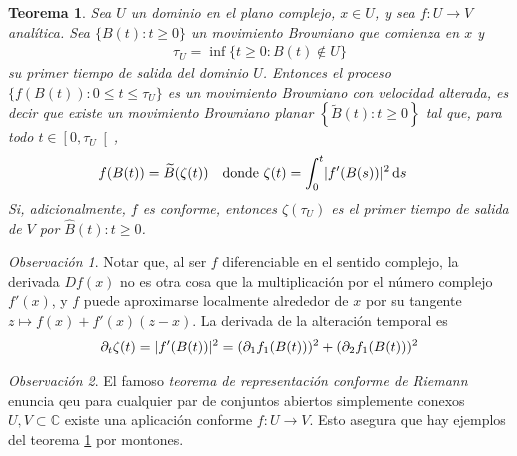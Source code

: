 \documentclass{article}
\newcommand{\dd}{\mathop{}\!\mathrm{d}}
\newcommand{\complexNumbers}{\mathbb{C}}
\DeclarePairedDelimiter{\abs}{\lvert}{\rvert}
\theoremstyle{plain}
\newtheorem{theorem}{Teorema}
\theoremstyle{remark}
\newtheorem{remark}{Observación}
\theoremstyle{definition}
\begin{document}
\begin{theorem}
  \label{theorem:ConformalInvarianceOfPlanarBrownianMotion}
  Sea \(U\) un dominio en el plano complejo, \(x \in U\), y sea \(f : U \rightarrow V\) analítica.
  Sea \(\{B(t) : t \geq 0\}\) un movimiento Browniano que comienza en \(x\) y
  \begin{align}
    \tau_U
    =
    \inf \{ t \geq 0 : B(t) \notin U\}
  \end{align}
  su primer tiempo de salida del dominio \(U\).
  Entonces el proceso
  \(\{f(B(t)) : 0 \leq t \leq \tau_U\}\)  %
  es un movimiento Browniano con velocidad alterada, es decir que existe un movimiento Browniano planar \(\left\{ \widetilde{B}(t) : t \geq 0 \right\}\) tal que, para todo \(t \in \left[ 0, \tau_U \right[\),
  \begin{align}
    & f(B(t)) = \widetilde{B}(\zeta(t))
    &
    & \text{donde }
    \zeta(t) = \int_0^t \abs{f'(B(s))}^2 \dd s
  \end{align}
  Si, adicionalmente, \(f\) es conforme, entonces \(\zeta(\tau_U)\) es el primer tiempo de salida de \(V\) por \(\widehat{B}(t) : t \geq 0\).
\end{theorem}
\begin{remark}
  Notar que, al ser \(f\) diferenciable en el sentido complejo, la derivada \(Df(x)\) no es otra cosa que la multiplicación por el número complejo \(f'(x)\), y \(f\) puede aproximarse localmente alrededor de \(x\) por su tangente \(z \mapsto f(x) + f'(x)(z - x)\).
  La derivada de la alteración temporal es
  \begin{align}
    \partial_t \zeta(t)
    =
    \abs{f'(B(t))}^2
    =
    (\partial_1 f_1(B(t)))^2 + (\partial_2 f_1(B(t)))^2
  \end{align}
\end{remark}
\begin{remark}
  El famoso \emph{teorema de representación conforme de Riemann} enuncia qeu para cualquier par de conjuntos abiertos simplemente conexos \(U, V \subset \complexNumbers\) existe una aplicación conforme \(f : U \rightarrow V\).
  Esto asegura que hay ejemplos del teorema \ref{theorem:ConformalInvarianceOfPlanarBrownianMotion} por montones.
\end{remark}
\end{document}
